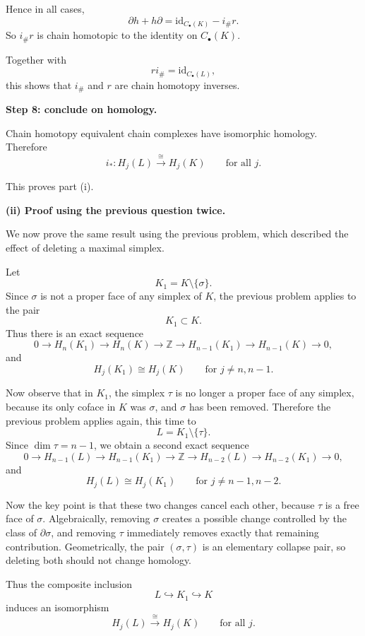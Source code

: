 \begin{solution}
Hence in all cases,
\[
\partial h+h\partial = \mathrm{id}_{C_\bullet(K)} - i_\# r.
\]
So \(i_\# r\) is chain homotopic to the identity on \(C_\bullet(K)\).

Together with
\[
r i_\# = \mathrm{id}_{C_\bullet(L)},
\]
this shows that \(i_\#\) and \(r\) are chain homotopy inverses.

\par

\textbf{Step 8: conclude on homology.}

Chain homotopy equivalent chain complexes have isomorphic homology. Therefore
\[
i_*:H_j(L)\xrightarrow{\cong} H_j(K)
\qquad\text{for all } j.
\]

This proves part (i).

\par

\textbf{(ii) Proof using the previous question twice.}

We now prove the same result using the previous problem, which described the effect of deleting a maximal simplex.

Let
\[
K_1 = K\setminus\{\sigma\}.
\]
Since \(\sigma\) is not a proper face of any simplex of \(K\), the previous problem applies to the pair
\[
K_1 \subset K.
\]
Thus there is an exact sequence
\[
0 \to H_n(K_1)\to H_n(K)\to \mathbb Z
\to H_{n-1}(K_1)\to H_{n-1}(K)\to 0,
\]
and
\[
H_j(K_1)\cong H_j(K)
\qquad\text{for } j\neq n,n-1.
\]

Now observe that in \(K_1\), the simplex \(\tau\) is no longer a proper face of any simplex, because its only coface in \(K\) was \(\sigma\), and \(\sigma\) has been removed. Therefore the previous problem applies again, this time to
\[
L = K_1\setminus\{\tau\}.
\]
Since \(\dim \tau=n-1\), we obtain a second exact sequence
\[
0 \to H_{n-1}(L)\to H_{n-1}(K_1)\to \mathbb Z
\to H_{n-2}(L)\to H_{n-2}(K_1)\to 0,
\]
and
\[
H_j(L)\cong H_j(K_1)
\qquad\text{for } j\neq n-1,n-2.
\]

Now the key point is that these two changes cancel each other, because \(\tau\) is a free face of \(\sigma\). Algebraically, removing \(\sigma\) creates a possible change controlled by the class of \(\partial \sigma\), and removing \(\tau\) immediately removes exactly that remaining contribution. Geometrically, the pair \((\sigma,\tau)\) is an elementary collapse pair, so deleting both should not change homology.

Thus the composite inclusion
\[
L \hookrightarrow K_1 \hookrightarrow K
\]
induces an isomorphism
\[
H_j(L)\xrightarrow{\cong} H_j(K)
\qquad\text{for all } j.
\]


\end{solution}
